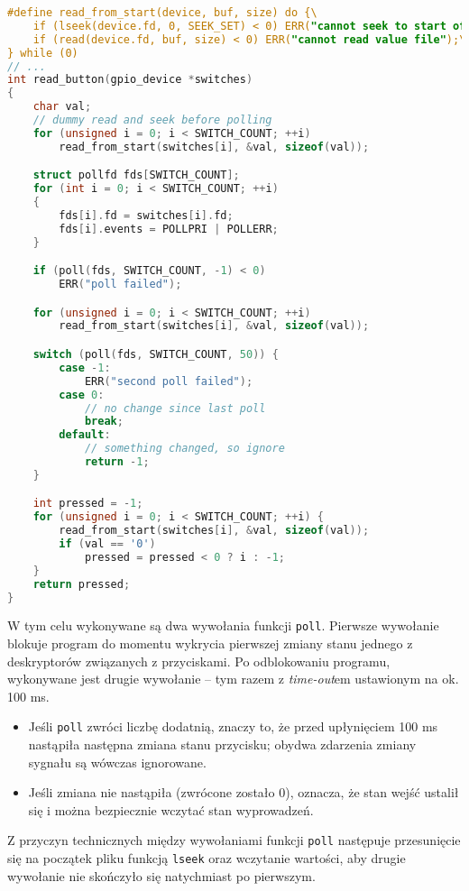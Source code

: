 \documentclass[10pt,a4paper]{article}
\begin{document}
\begin{lstlisting}[language=C,caption=Detekcja wciśnięć pojedynczego przycisku -- funkcja \texttt{read\_button}]
#define read_from_start(device, buf, size) do {\
	if (lseek(device.fd, 0, SEEK_SET) < 0) ERR("cannot seek to start of file");\
	if (read(device.fd, buf, size) < 0) ERR("cannot read value file");\
} while (0)
// ...
int read_button(gpio_device *switches)
{
	char val;
	// dummy read and seek before polling
	for (unsigned i = 0; i < SWITCH_COUNT; ++i)
		read_from_start(switches[i], &val, sizeof(val));

	struct pollfd fds[SWITCH_COUNT];
	for (int i = 0; i < SWITCH_COUNT; ++i)
	{
		fds[i].fd = switches[i].fd;
		fds[i].events = POLLPRI | POLLERR;
	}

	if (poll(fds, SWITCH_COUNT, -1) < 0)
		ERR("poll failed");

	for (unsigned i = 0; i < SWITCH_COUNT; ++i)
		read_from_start(switches[i], &val, sizeof(val));

	switch (poll(fds, SWITCH_COUNT, 50)) {
		case -1:
			ERR("second poll failed");
		case 0:
			// no change since last poll
			break;
		default:
			// something changed, so ignore
			return -1;
	}

	int pressed = -1;
	for (unsigned i = 0; i < SWITCH_COUNT; ++i) {
		read_from_start(switches[i], &val, sizeof(val));
		if (val == '0')
			pressed = pressed < 0 ? i : -1;
	}
	return pressed;
}
\end{lstlisting}

W tym celu wykonywane są dwa wywołania funkcji \verb+poll+. Pierwsze wywołanie blokuje program do momentu wykrycia pierwszej zmiany stanu jednego z deskryptorów związanych z przyciskami. Po odblokowaniu programu, wykonywane jest drugie wywołanie -- tym razem z \emph{time-out}em ustawionym na ok. 100 ms.

\begin{itemize}
	\item Jeśli \verb+poll+ zwróci liczbę dodatnią, znaczy to, że przed upłynięciem 100 ms nastąpiła następna zmiana stanu przycisku; obydwa zdarzenia zmiany sygnału są wówczas ignorowane.
	\item Jeśli zmiana nie nastąpiła (zwrócone zostało 0), oznacza, że stan wejść ustalił się i można bezpiecznie wczytać stan wyprowadzeń.
\end{itemize}

Z przyczyn technicznych między wywołaniami funkcji \verb+poll+ następuje przesunięcie się na początek pliku funkcją \verb+lseek+ oraz wczytanie wartości, aby drugie wywołanie nie skończyło się natychmiast po pierwszym.
\end{document}
